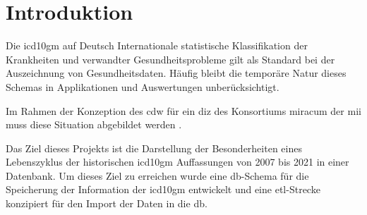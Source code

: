 \section{Introduktion}
	Die \ac{icd10gm} auf Deutsch Internationale statistische Klassifikation der Krankheiten und  verwandter Gesundheitsprobleme \cite{icd10} gilt als Standard bei der Auszeichnung von Gesundheitsdaten. Häufig bleibt die temporäre Natur dieses Schemas in Applikationen und Auswertungen unberücksichtigt.
	
	Im Rahmen der Konzeption des \ac{cdw} für ein  \ac{diz} des Konsortiums \ac{miracum} der \ac{mii} muss diese Situation abgebildet werden \cite{willidea}. 
	
	Das Ziel dieses Projekts ist die Darstellung der Besonderheiten eines Lebenszyklus der historischen \ac{icd10gm} Auffassungen von 2007 bis 2021 in einer Datenbank. Um dieses Ziel zu erreichen wurde eine \ac{db}-Schema für die Speicherung der Information der \ac{icd10gm} entwickelt und eine \ac{etl}-Strecke konzipiert für den Import der Daten in die \ac{db}.
	
	